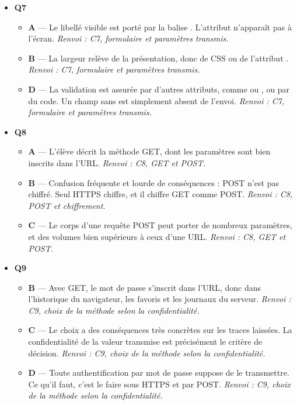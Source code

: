 \begin{itemize}
\begin{itemize}
  \end{itemize}
  \item \textbf{Q7}
  \begin{itemize}
    \item \textbf{A} — Le libellé visible est porté par la balise . L'attribut  n'apparaît pas à l'écran. \emph{Renvoi : C7, formulaire et paramètres transmis.}
    \item \textbf{B} — La largeur relève de la présentation, donc de CSS ou de l'attribut . \emph{Renvoi : C7, formulaire et paramètres transmis.}
    \item \textbf{D} — La validation est assurée par d'autres attributs, comme  ou , ou par du code. Un champ sans  est simplement absent de l'envoi. \emph{Renvoi : C7, formulaire et paramètres transmis.}
  \end{itemize}
  \item \textbf{Q8}
  \begin{itemize}
    \item \textbf{A} — L'élève décrit la méthode GET, dont les paramètres sont bien inscrits dans l'URL. \emph{Renvoi : C8, GET et POST.}
    \item \textbf{B} — Confusion fréquente et lourde de conséquences : POST n'est pas chiffré. Seul HTTPS chiffre, et il chiffre GET comme POST. \emph{Renvoi : C8, POST et chiffrement.}
    \item \textbf{C} — Le corps d'une requête POST peut porter de nombreux paramètres, et des volumes bien supérieurs à ceux d'une URL. \emph{Renvoi : C8, GET et POST.}
  \end{itemize}
  \item \textbf{Q9}
  \begin{itemize}
    \item \textbf{B} — Avec GET, le mot de passe s'inscrit dans l'URL, donc dans l'historique du navigateur, les favoris et les journaux du serveur. \emph{Renvoi : C9, choix de la méthode selon la confidentialité.}
    \item \textbf{C} — Le choix a des conséquences très concrètes sur les traces laissées. La confidentialité de la valeur transmise est précisément le critère de décision. \emph{Renvoi : C9, choix de la méthode selon la confidentialité.}
    \item \textbf{D} — Toute authentification par mot de passe suppose de le transmettre. Ce qu'il faut, c'est le faire sous HTTPS et par POST. \emph{Renvoi : C9, choix de la méthode selon la confidentialité.}

\end{itemize}
\end{itemize}
